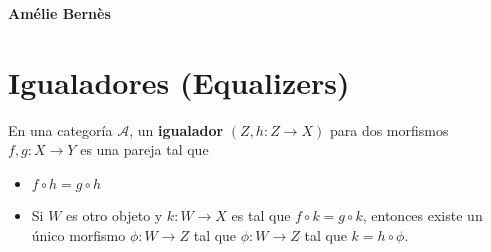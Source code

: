 \documentclass[10pt]{article}
\newtheorem[M]{teo}{Teorema}[section]
\newtheorem[M]{listaObj}[teo]{Lista de deseos}
\newtheorem[M]{preg}[teo]{Pregunta}
\newtheorem[M]{lema}[teo]{Lema}
\newtheorem[M]{hip}[teo]{Hipótesis}
\newtheorem[M]{prop}[teo]{Proposición}
\newtheorem[M]{obs}[teo]{Observación}
\newtheorem[M]{cor}[teo]{Corolario}
\newtheorem[M]{defi}[teo]{Definición}
\newtheorem[M]{notacion}[teo]{Notación}
\newtheorem[M]{nota}[teo]{Nota}
\begin{document}
\begin{flushright}
\textbf{Amélie Bernès}
\end{flushright}

\section{Igualadores (Equalizers)}
En una categoría $\mathcal{A}$, un \textbf{igualador}
$(Z, h: Z \longrightarrow X)$ para dos morfismos 
$f, g : X \longrightarrow Y$ es una pareja tal que 

\begin{minipage}{0.5\textwidth}
\begin{itemize}
	\item $f \circ h = g \circ h$
	\item Si $W$ es otro objeto y $k : W \longrightarrow X$
	es tal que $f \circ k = g \circ k$, entonces
	existe un único morfismo $\phi: W \longrightarrow Z$ tal que
	$\phi: W \longrightarrow Z$ tal que $k = h \circ \phi$. 
\end{itemize}
\end{minipage} \hfill
\end{document}
